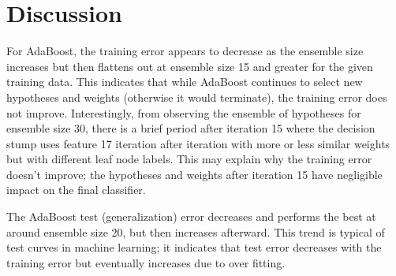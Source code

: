 \documentclass[12pt]{article}
\begin{document}
\section{Discussion}
For AdaBoost, the training error appears to decrease as the ensemble size increases but then flattens out at ensemble size 15 and greater for the given training data. This indicates that while AdaBoost continues to select new hypotheses and weights (otherwise it would terminate), the training error does not improve. Interestingly, from observing the ensemble of hypotheses for ensemble size 30, there is a brief period after iteration 15 where the decision stump uses feature 17 iteration after iteration with more or less similar weights but with different leaf node labels. This may explain why the training error doesn't improve; the hypotheses and weights after iteration 15 have negligible impact on the final classifier.

The AdaBoost test (generalization) error decreases and performs the best at around ensemble size 20, but then increases afterward. This trend is typical of test curves in machine learning; it indicates that test error decreases with the training error but eventually increases due to over fitting.

%
%
\end{document}
